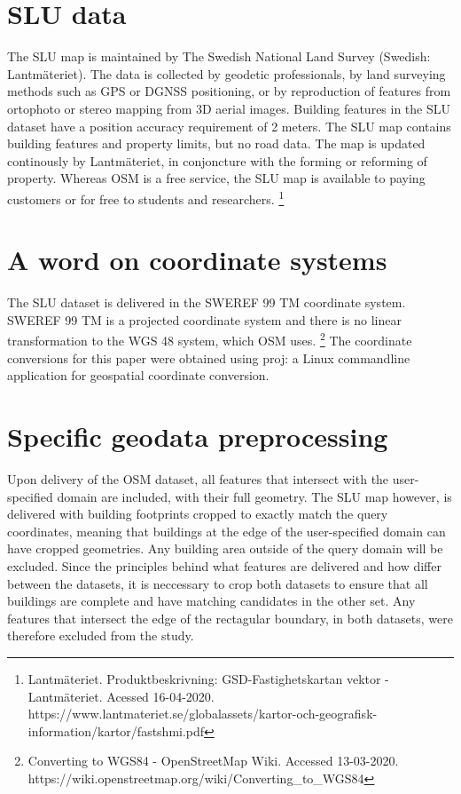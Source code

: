 \documentclass{kththesis}
\begin{document}
\section{SLU data}

The SLU map is maintained by The Swedish National Land Survey (Swedish: Lantmäteriet).
The data is collected by geodetic professionals, by land surveying methods such as GPS or DGNSS positioning, or by reproduction of features from ortophoto or stereo mapping from 3D aerial images.
Building features in the SLU dataset have a position accuracy requirement of 2 meters.
The SLU map contains building features and property limits, but no road data.
The map is updated continously by Lantmäteriet, in conjoncture with the forming or reforming of property.
Whereas OSM is a free service, the SLU map is available to paying customers or for free to students and researchers. \footnote{Lantmäteriet. Produktbeskrivning: GSD-Fastighetskartan vektor - Lantmäteriet. Acessed 16-04-2020. https://www.lantmateriet.se/globalassets/kartor-och-geografisk-information/kartor/fastshmi.pdf}

\section{A word on coordinate systems}

The SLU dataset is delivered in the SWEREF 99 TM coordinate system.
SWEREF 99 TM is a projected coordinate system and there is no linear transformation to the WGS 48 system, which OSM uses. \footnote{Converting to WGS84 - OpenStreetMap Wiki. Accessed 13-03-2020. https://wiki.openstreetmap.org/wiki/Converting\_to\_WGS84}
The coordinate conversions for this paper were obtained using proj: a Linux commandline application for geospatial coordinate conversion.

\section{Specific geodata preprocessing}

Upon delivery of the OSM dataset, all features that intersect with the user-specified domain are included, with their full geometry.
The SLU map however, is delivered with building footprints cropped to exactly match the query coordinates, meaning that buildings at the edge of the user-specified domain can have cropped geometries.
Any building area outside of the query domain will be excluded.
Since the principles behind what features are delivered and how differ between the datasets, it is neccessary to crop both datasets to ensure that all buildings are complete and have matching candidates in the other set.
Any features that intersect the edge of the rectagular boundary, in both datasets, were therefore excluded from the study.
\end{document}
